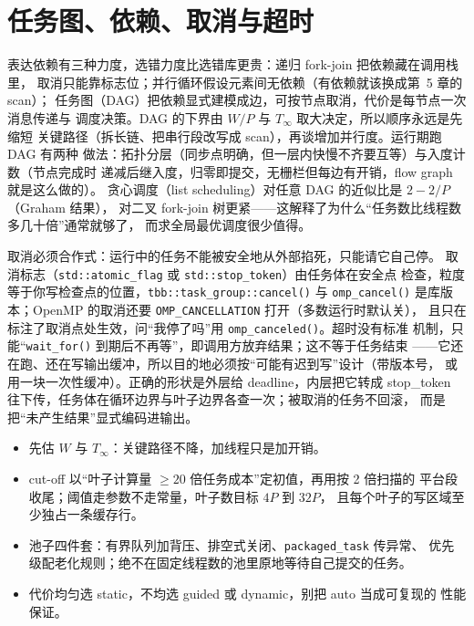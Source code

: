 \documentclass[12pt,a4paper,fontset=fandol]{ctexbook}
\newcommand{\Fn}[1]{\texttt{#1()}}
\newcommand{\Tp}[1]{\texttt{#1}}
\begin{document}
\section{任务图、依赖、取消与超时}

表达依赖有三种力度，选错力度比选错库更贵：递归 fork-join 把依赖藏在调用栈里，
取消只能靠标志位；并行循环假设元素间无依赖（有依赖就该换成第~5 章的 scan）；
任务图（DAG）把依赖显式建模成边，可按节点取消，代价是每节点一次消息传递与
调度决策。DAG 的下界由 $W/P$ 与 $T_\infty$ 取大决定，所以顺序永远是先缩短
关键路径（拆长链、把串行段改写成 scan），再谈增加并行度。运行期跑 DAG 有两种
做法：拓扑分层（同步点明确，但一层内快慢不齐要互等）与入度计数（节点完成时
递减后继入度，归零即提交，无栅栏但每边有开销，flow graph 就是这么做的）。
贪心调度（list scheduling）对任意 DAG 的近似比是 $2-2/P$（Graham 结果），
对二叉 fork-join 树更紧——这解释了为什么``任务数比线程数多几十倍''通常就够了，
而求全局最优调度很少值得。

取消必须合作式：运行中的任务不能被安全地从外部掐死，只能请它自己停。
取消标志（\Tp{std::atomic\_flag} 或 \Tp{std::stop\_token}）由任务体在安全点
检查，粒度等于你写检查点的位置，\Fn{tbb::task\_group::cancel} 与 \Fn{omp\_cancel}
是库版本；OpenMP 的取消还要 \Tp{OMP\_CANCELLATION} 打开（多数运行时默认关），
且只在标注了取消点处生效，问``我停了吗''用 \Fn{omp\_canceled}。超时没有标准
机制，只能``\Fn{wait\_for} 到期后不再等''，即调用方放弃结果；这不等于任务结束
——它还在跑、还在写输出缓冲，所以目的地必须按``可能有迟到写''设计（带版本号，
或用一块一次性缓冲）。正确的形状是外层给 deadline，内层把它转成 stop\_token
往下传，任务体在循环边界与叶子边界各查一次；被取消的任务不回滚，
而是把``未产生结果''显式编码进输出。

\begin{bestpractice}[title={分解与调度的落地清单}]
\begin{itemize}
  \item 先估 $W$ 与 $T_\infty$：关键路径不降，加线程只是加开销。
  \item cut-off 以``叶子计算量 $\ge 20$ 倍任务成本''定初值，再用按 2 倍扫描的
        平台段收尾；阈值走参数不走常量，叶子数目标 $4P$ 到 $32P$，
        且每个叶子的写区域至少独占一条缓存行。
  \item 池子四件套：有界队列加背压、排空式关闭、\Tp{packaged\_task} 传异常、
        优先级配老化规则；绝不在固定线程数的池里原地等待自己提交的任务。
  \item 代价均匀选 static，不均选 guided 或 dynamic，别把 auto 当成可复现的
        性能保证。
\end{itemize}
\end{bestpractice}
\end{document}
